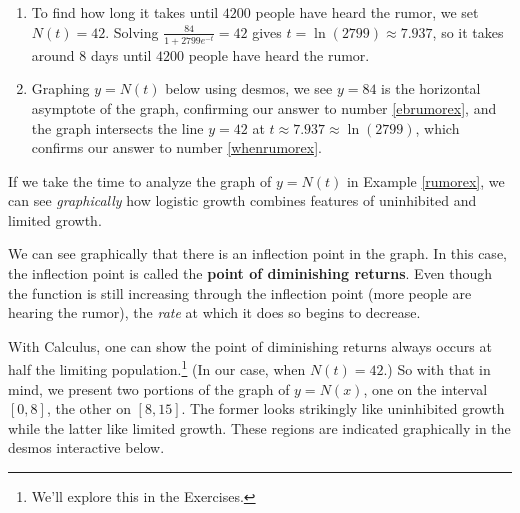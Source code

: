 \documentclass{ximera}
\begin{document}
\begin{example}
\begin{explanation}
\begin{enumerate}
Hence, $\lim_{t \rightarrow \infty} N(t) = 84$.     This means that as time goes by, the number of people who will have heard the rumor approaches $8400$. 

\item  To find how long it takes until $4200$ people have heard the rumor, we set $N(t) = 42$.  Solving $\frac{84}{1+2799e^{-t}} = 42$ gives $t =  \ln(2799) \approx 7.937$, so   it takes around $8$ days until $4200$ people have heard the rumor.

\item  Graphing $y=N(t)$ below using desmos, we see $y=84$ is the horizontal asymptote of the graph, confirming our answer to number  \ref{ebrumorex}, and the graph intersects the line $y=42$ at $t \approx 7.937 \approx \ln(2799) $, which confirms our answer to number \ref{whenrumorex}.

\begin{center}
\end{center}

\end{enumerate}
\end{explanation}
\end{example}

If we take the time to analyze the graph of $y=N(t)$ in Example \ref{rumorex}, we can see \textit{graphically} how logistic growth combines  features of uninhibited and limited growth.  

We can see graphically that there is an inflection point in the graph. In this case, the inflection point is called the \textbf{point of diminishing returns}.    Even though the function is still increasing through the inflection point (more people are hearing the rumor), the \textit{rate} at which it does so begins to decrease. 

With Calculus, one can show the point of diminishing returns always occurs at half the limiting population.\footnote{We'll explore this in the Exercises.}  (In our case, when $N(t)=42$.)  So with that in mind, we present two portions of the graph of $y=N(x)$, one on the interval $[0,8]$, the other on $[8,15]$. The former looks strikingly like uninhibited growth while the latter like limited growth.  These regions are indicated graphically in the desmos interactive below.

\begin{center}
\end{center}
\end{document}
